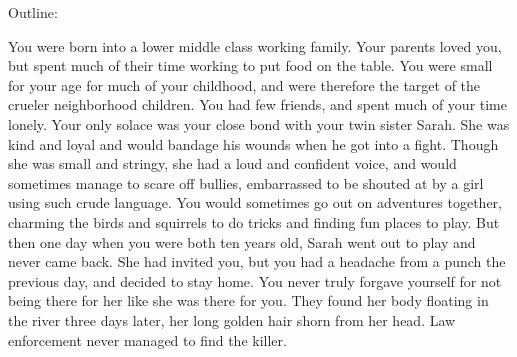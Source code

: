\documentclass[char]{guildcamp3}
\begin{document}
\name{\cRogueOne{}}

\updatemacro{\cNPC}{
  \unknownplayer %
  }




Outline:

You were born into a lower middle class working family. Your parents loved you, but spent much of their time working to put food on the table. You were small for your age for much of your childhood, and were therefore the target of the crueler neighborhood children. You had few friends, and spent much of your time lonely. Your only solace was your close bond with your twin sister Sarah. She was kind and loyal and would bandage his wounds when he got into a fight. Though she was small and stringy, she had a loud and confident voice, and would sometimes manage to scare off bullies, embarrassed to be shouted at by a girl using such crude language. You would sometimes go out on adventures together, charming the birds and squirrels to do tricks and finding fun places to play. But then one day when you were both ten years old, Sarah went out to play and never came back. She had invited you, but you had a headache from a punch the previous day, and decided to stay home. You never truly forgave yourself for not being there for her like she was there for you. They found her body floating in the river three days later, her long golden hair shorn from her head. Law enforcement never managed to find the killer.
\end{document}
